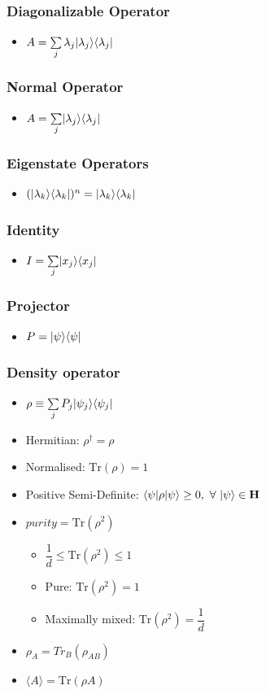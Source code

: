 \documentclass[]{report}
\DeclarePairedDelimiter\bra{\langle}{\rvert}
\DeclarePairedDelimiter\ket{\lvert}{\rangle}
\newcommand \tab[1][1cm]{\hspace*{#1}}
\newcommand{\itemt}{\item \tab}
\begin{document}
\subsubsection{Diagonalizable Operator}			
\begin{itemize}
\itemt \( A = \sum\limits_{j} \lambda_j \ket{\lambda_j} \bra{\lambda_j} \)
\end{itemize}

\subsubsection{Normal Operator}			
\begin{itemize}
\itemt \( A =\sum\limits_{j} \ket{\lambda_j} \bra{\lambda_j} \)
\end{itemize}

\subsubsection{Eigenstate Operators}			
\begin{itemize}
\itemt \( (\ket{\lambda_k}\bra{\lambda_k})^n = \ket{\lambda_k}\bra{\lambda_k} \)
\end{itemize}

\subsubsection{Identity}
\begin{itemize}
\itemt \( I = \sum\limits_{j} \ket{x_j} \bra{x_j} \)
\end{itemize}

\subsubsection{Projector}
\begin{itemize}
\itemt \( P = \ket{\psi} \bra{\psi} \)
\end{itemize}				

\subsubsection{Density operator}
\begin{itemize}
\itemt \( \rho \equiv \sum\limits_{j} P_j \ket{\psi_j}\bra{\psi_j} \)
\itemt Hermitian: \( \rho^\dagger = \rho \)
\itemt Normalised: \( \mathrm{Tr} (\rho) = 1 \)
\itemt Positive Semi-Definite: \( \bra{\psi}\rho\ket{\psi} \geq 0, \ \forall \ \ket{\psi} \in \mathbf{H} \)
\itemt \( purity = \mathrm{Tr} (\rho^2) \)
	\begin{itemize}
	\itemt \( \dfrac{1}{d} \leq \mathrm{Tr} (\rho^2) \leq 1 \)
	\itemt Pure: \( \mathrm{Tr} (\rho^2) = 1 \)
	\itemt Maximally mixed: \( \mathrm{Tr} (\rho^2) = \dfrac{1}{d} \)
	\end{itemize}
\itemt \( \rho_A = Tr_B(\rho_{AB}) \)
\itemt \( \langle A\rangle = \mathrm{Tr} (\rho A) \)
\end{itemize}				
\end{document}
